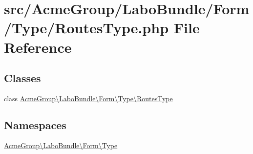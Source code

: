\hypertarget{_routes_type_8php}{\section{src/\+Acme\+Group/\+Labo\+Bundle/\+Form/\+Type/\+Routes\+Type.php File Reference}
\label{_routes_type_8php}
}
\subsection*{Classes}
\begin{DoxyCompactItemize}
\item 
class \hyperlink{class_acme_group_1_1_labo_bundle_1_1_form_1_1_type_1_1_routes_type}{Acme\+Group\textbackslash{}\+Labo\+Bundle\textbackslash{}\+Form\textbackslash{}\+Type\textbackslash{}\+Routes\+Type}
\end{DoxyCompactItemize}
\subsection*{Namespaces}
\begin{DoxyCompactItemize}
\item 
 \hyperlink{namespace_acme_group_1_1_labo_bundle_1_1_form_1_1_type}{Acme\+Group\textbackslash{}\+Labo\+Bundle\textbackslash{}\+Form\textbackslash{}\+Type}
\end{DoxyCompactItemize}
